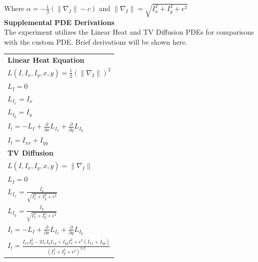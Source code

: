\documentclass{article}
\begin{document}
    \noindent
    Where $\alpha = -\frac{1}{\beta}(\| \nabla_{I} \|-c)$ and $\| \nabla_{I} \| = \sqrt{I_{x}^2 + I_{y}^2 + \epsilon^2}$\\

    \newpage
    \noindent
    \vspace{12pt}
    \textbf{Supplemental PDE Derivations}\\
    \noindent
    The experiment utilizes the Linear Heat and TV Diffusion PDEs for comparisons with the custom PDE.
    Brief derivations will be shown here.\\

    \noindent
    \begin{center}
      \begin{tabular}{l}
        \vspace{12pt}
        \textbf{Linear Heat Equation}\\
        \vspace{12pt}
        $L(I,I_{x},I_{y},x,y) = \frac{1}{2} (\| \nabla_{I} \|)^{2}$\\
        \vspace{12pt}
        $L_{I} = 0$\\
        \vspace{12pt}
        $L_{I_{x}} = I_{x}$\\
        \vspace{12pt}
        $L_{I_{y}} = I_{y}$\\
        \vspace{12pt}
        $I_{t} = -L_{I} + \frac{\partial}{\partial x}L_{I_{x}} + \frac{\partial}{\partial y}L_{I_{y}}$\\
        \vspace{24pt}
        $I_{t} = I_{xx} + I_{yy}$\\
        \vspace{12pt}
        \textbf{TV Diffusion}\\
        \vspace{12pt}
        $L(I,I_{x},I_{y},x,y) = \| \nabla_{I} \|$\\
        \vspace{12pt}
        $L_{I} = 0$\\
        \vspace{12pt}
        $L_{I_{x}} = \frac{I_{x}}{\sqrt{I_{x}^2 + I_{y}^2+ \epsilon^2}}$\\
        \vspace{12pt}
        $L_{I_{y}} = \frac{I_{y}}{\sqrt{I_{x}^2 + I_{y}^2+ \epsilon^2}}$\\
        \vspace{12pt}
        $I_{t} = -L_{I} + \frac{\partial}{\partial x}L_{I_{x}} + \frac{\partial}{\partial y}L_{I_{y}}$\\
        \vspace{12pt}
        $I_{t} = \frac{ I_{xx} I_{y}^2 - 2I_{x}I_{y}I_{xy} + I_{yy} I_{x}^2 + \epsilon^2(I_{xx} + I_{yy})} {(I_{x}^2 + I_{y}^2 + \epsilon^2)^{3/2}}$
      \end{tabular}
    \end{center}
\end{document}

